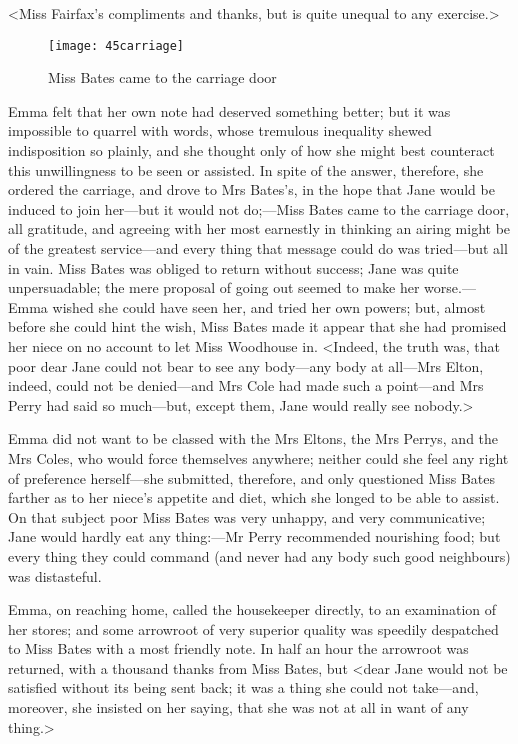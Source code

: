 <Miss Fairfax's compliments and thanks, but is quite unequal to any exercise.>

\begin{figure}[tbph]
\centering
\texttt{[image: 45carriage]}
\caption{Miss Bates came to the carriage door}
\end{figure}

Emma felt that her own note had deserved something better; but it was impossible to quarrel with words, whose tremulous inequality shewed indisposition so plainly, and she thought only of how she might best counteract this unwillingness to be seen or assisted. In spite of the answer, therefore, she ordered the carriage, and drove to Mrs Bates's, in the hope that Jane would be induced to join her—but it would not do;—Miss Bates came to the carriage door, all gratitude, and agreeing with her most earnestly in thinking an airing might be of the greatest service—and every thing that message could do was tried—but all in vain. Miss Bates was obliged to return without success; Jane was quite unpersuadable; the mere proposal of going out seemed to make her worse.—Emma wished she could have seen her, and tried her own powers; but, almost before she could hint the wish, Miss Bates made it appear that she had promised her niece on no account to let Miss Woodhouse in. <Indeed, the truth was, that poor dear Jane could not bear to see any body—any body at all—Mrs Elton, indeed, could not be denied—and Mrs Cole had made such a point—and Mrs Perry had said so much—but, except them, Jane would really see nobody.>

Emma did not want to be classed with the Mrs Eltons, the Mrs Perrys, and the Mrs Coles, who would force themselves anywhere; neither could she feel any right of preference herself—she submitted, therefore, and only questioned Miss Bates farther as to her niece's appetite and diet, which she longed to be able to assist. On that subject poor Miss Bates was very unhappy, and very communicative; Jane would hardly eat any thing:—Mr Perry recommended nourishing food; but every thing they could command (and never had any body such good neighbours) was distasteful.

Emma, on reaching home, called the housekeeper directly, to an examination of her stores; and some arrowroot of very superior quality was speedily despatched to Miss Bates with a most friendly note. In half an hour the arrowroot was returned, with a thousand thanks from Miss Bates, but <dear Jane would not be satisfied without its being sent back; it was a thing she could not take—and, moreover, she insisted on her saying, that she was not at all in want of any thing.>

